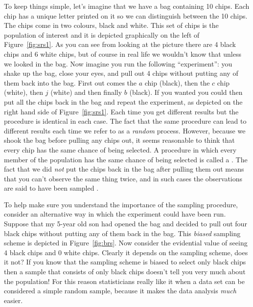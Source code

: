 To keep things simple, let's imagine that we have a bag containing 10 chips. Each chip has a unique letter printed on it so we can distinguish between the 10 chips. The chips come in two colours, black and white. This set of chips is the population of interest and it is depicted graphically on the left of Figure~\ref{fig:srs1}. As you can see from looking at the picture there are 4 black chips and 6 white chips, but of course in real life we wouldn't know that unless we looked in the bag. Now imagine you run the following ``experiment'': you shake up the bag, close your eyes, and pull out 4 chips without putting any of them back into the bag. First out comes the $a$ chip (black), then the $c$ chip (white), then $j$ (white) and then finally $b$ (black). If you wanted you could then put all the chips back in the bag and repeat the experiment, as depicted on the right hand side of Figure~\ref{fig:srs1}. Each time you get different results but the procedure is identical in each case. The fact that the same procedure can lead to different results each time we refer to as a {\it random} process. However, because we shook the bag before pulling any chips out, it seems reasonable to think that every chip has the same chance of being selected. A procedure in which every member of the population has the same chance of being selected is called a . The fact that we did {\it not} put the chips back in the bag after pulling them out means that you can't observe the same thing twice, and in such cases the observations are said to have been sampled . 

To help make sure you understand the importance of the sampling procedure, consider an alternative way in which the experiment could have been run. Suppose that my 5-year old son had opened the bag and decided to pull out four black chips without putting any of them back in the bag. This {\it biased} sampling scheme is depicted in Figure~\ref{fig:brs}. Now consider the evidential value of seeing 4 black chips and 0 white chips. Clearly it depends on the sampling scheme, does it not? If you know that the sampling scheme is biased to select only black chips then a sample that consists of only black chips doesn't tell you very much about the population! For this reason statisticians really like it when a data set can be considered a simple random sample, because it makes the data analysis {\it much} easier.  

